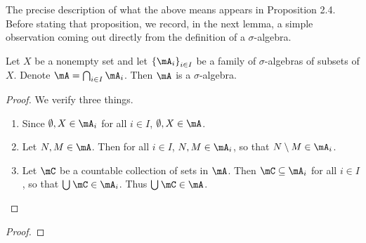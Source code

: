 \documentclass[pmath450]{subfiles}
\begin{document}
    The precise description of what the above means appears in Proposition 2.4. Before stating that proposition, we record, in the next lemma, a simple observation coming out directly from the definition of a $\sigma$-algebra. 

    \begin{lemma}{}
        Let $X$ be a nonempty set and let $\left\lbrace \mA_i \right\rbrace^{}_{i\in I}$ be a family of $\sigma$-algebras of subsets of $X$. Denote $\mA=\bigcap^{}_{i\in I}\mA_i$. Then $\mA$ is a $\sigma$-algebra.
    \end{lemma}

    \begin{proof}
        We verify three things.
        \begin{enumerate}
            \item Since $\emptyset,X\in\mA_i$ for all $i\in I$, $\emptyset,X\in\mA$.
            \item Let $N,M\in\mA$. Then for all $i\in I$, $N,M\in\mA_i$, so that $N\setminus M\in\mA_i$.
            \item Let $\mC$ be a countable collection of sets in $\mA$. Then $\mC\subseteq\mA_i$ for all $i\in I$, so that $\bigcup^{}_{}\mC\in\mA_i$. Thus $\bigcup^{}_{}\mC\in\mA$.
        \end{enumerate}
    \end{proof}

    \begin{proof}
    \end{proof}
\end{document}
